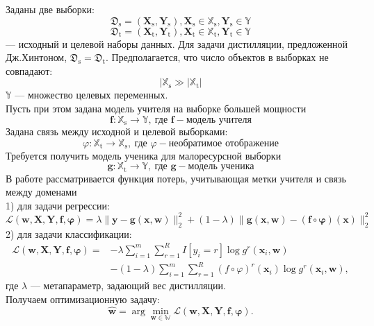 Заданы две выборки: $$\mathfrak{D}_{\text{s}}=(\textbf{X}_{\text{s}},\textbf{Y}_{\text{s}}), \textbf{X}_{\text{s}} \in \mathbb{X}_{\text{s}}, \textbf{Y}_{\text{s}} \in \mathbb{Y}$$
$$\mathfrak{D}_{\text{t}}=(\textbf{X}_{\text{t}},\textbf{Y}_{\text{t}}), \textbf{X}_{\text{t}} \in \mathbb{X}_{\text{t}}, \textbf{Y}_{\text{t}} \in \mathbb{Y}$$
--- исходный и целевой наборы данных. Для задачи дистилляции, предложенной Дж.Хинтоном, $\mathfrak{D}_{\text{s}}=\mathfrak{D}_{\text{t}}$. Предполагается, что число объектов в выборках не совпадают: $$|\mathbb{X}_{\text{s}} \gg |\mathbb{X}_{\text{t}}|$$
$\mathbb{Y}$ --- множество целевых переменных.\\
Пусть при этом задана модель учителя на выборке большей мощности
$$\textbf{f}: \mathbb{X}_{\text{s}} \rightarrow \mathbb{Y}, \ \text{где } \mathbf{f}-\text{модель учителя}$$
Задана связь между исходной и целевой выборками:
$$\varphi: \mathbb{X}_{\text{t}} \rightarrow \mathbb{X}_{\text{s}}, \ \text{где } \varphi-\text{необратимое отображение}$$ 
Требуется получить модель ученика для малоресурсной выборки $$\textbf{g}: \mathbb{X}_{\text{t}} \rightarrow \mathbb{Y}, \ \text{где } \mathbf{g}-\text{модель ученика}$$
В работе рассматривается функция потерь, учитывающая метки учителя и связь между доменами\\
1) для задачи регрессии:
$$\mathcal{L}(\mathbf{w,X,Y,f,\varphi})=\lambda\|\mathbf{y}-\mathbf{g}(\mathbf{x},\mathbf{w})\|_{2}^{2}+(1-\lambda)\|\mathbf{g}(\mathbf{x},\mathbf{w})-(\mathbf{f}\circ \mathbf{\varphi})(\mathbf{x})\|_{2}^{2}$$
2) для задачи классификации:
\[
\begin{aligned}
\mathcal{L}(\mathbf{w,X,Y,f,\varphi})=&-\lambda\sum\limits_{i=1}^{m}\sum\limits_{r=1}^{R}I[y_{i}=r]\log{g^{r}(\mathbf{x}_{i},\mathbf{w})}\\
&-(1-\lambda)\sum\limits_{i=1}^{m}\sum\limits_{r=1}^{R}(f\circ \varphi)^{r}(\mathbf{x}_{i})\log{g^{r}(\mathbf{x}_{i},\mathbf{w})},
\end{aligned}
\]
где $\lambda$ --- метапараметр, задающий вес дистилляции.\\
Получаем оптимизационную задачу:
$$\hat{\mathbf{w}} = \arg\min_{\mathbf{w} \in \mathbb{W}} \mathcal{L}(\mathbf{w,X,Y,f,\varphi}).$$
